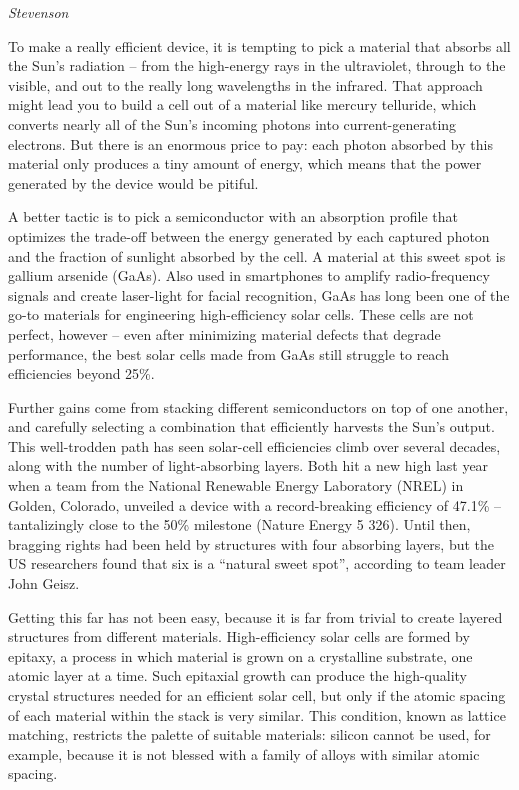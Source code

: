 \documentclass[
]{book}
\begin{document}
\emph{Stevenson}

To make a really efficient device, it is tempting to pick a material that absorbs all the Sun's radiation -- from the high-energy rays in the ultraviolet, through to the visible, and out to the really long wavelengths in the infrared. That approach might lead you to build a cell out of a material like mercury telluride, which converts nearly all of the Sun's incoming photons into current-generating electrons. But there is an enormous price to pay: each photon absorbed by this material only produces a tiny amount of energy, which means that the power generated by the device would be pitiful.

A better tactic is to pick a semiconductor with an absorption profile that optimizes the trade-off between the energy generated by each captured photon and the fraction of sunlight absorbed by the cell. A material at this sweet spot is gallium arsenide (GaAs). Also used in smartphones to amplify radio-frequency signals and create laser-light for facial recognition, GaAs has long been one of the go-to materials for engineering high-efficiency solar cells. These cells are not perfect, however -- even after minimizing material defects that degrade performance, the best solar cells made from GaAs still struggle to reach efficiencies beyond 25\%.

Further gains come from stacking different semiconductors on top of one another, and carefully selecting a combination that efficiently harvests the Sun's output. This well-trodden path has seen solar-cell efficiencies climb over several decades, along with the number of light-absorbing layers. Both hit a new high last year when a team from the National Renewable Energy Laboratory (NREL) in Golden, Colorado, unveiled a device with a record-breaking efficiency of 47.1\% -- tantalizingly close to the 50\% milestone (Nature Energy 5 326). Until then, bragging rights had been held by structures with four absorbing layers, but the US researchers found that six is a ``natural sweet spot'', according to team leader John Geisz.

Getting this far has not been easy, because it is far from trivial to create layered structures from different materials. High-efficiency solar cells are formed by epitaxy, a process in which material is grown on a crystalline substrate, one atomic layer at a time. Such epitaxial growth can produce the high-quality crystal structures needed for an efficient solar cell, but only if the atomic spacing of each material within the stack is very similar. This condition, known as lattice matching, restricts the palette of suitable materials: silicon cannot be used, for example, because it is not blessed with a family of alloys with similar atomic spacing.
\end{document}
